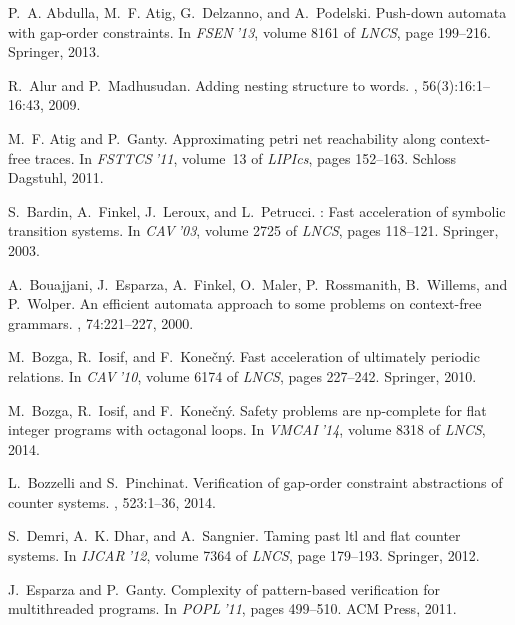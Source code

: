 \documentclass[final]{llncs}
\begin{document}

\begin{thebibliography}{10}

P.~A. Abdulla, M.~F. Atig, G.~Delzanno, and A.~Podelski.
\newblock Push-down automata with gap-order constraints.
\newblock In {\em FSEN$\:$'13}, volume 8161 of {\em LNCS}, page 199–216.
  Springer, 2013.

R.~Alur and P.~Madhusudan.
\newblock Adding nesting structure to words.
, 56(3):16:1--16:43, 2009.

M.~F. Atig and P.~Ganty.
\newblock Approximating petri net reachability along context-free traces.
\newblock In {\em FSTTCS$\:$'11}, volume~13 of {\em LIPIcs}, pages 152--163.
  Schloss Dagstuhl, 2011.

S.~Bardin, A.~Finkel, J.~Leroux, and L.~Petrucci.
: Fast acceleration of symbolic transition systems.
\newblock In {\em CAV$\:$'03}, volume 2725 of {\em LNCS}, pages 118--121.
  Springer, 2003.

A.~Bouajjani, J.~Esparza, A.~Finkel, O.~Maler, P.~Rossmanith, B.~Willems, and
  P.~Wolper.
\newblock An efficient automata approach to some problems on context-free
  grammars.
, 74:221--227, 2000.

M.~Bozga, R.~Iosif, and F.~Kone\v{c}n\'{y}.
\newblock Fast acceleration of ultimately periodic relations.
\newblock In {\em CAV$\:$'10}, volume 6174 of {\em LNCS}, pages 227--242.
  Springer, 2010.

M.~Bozga, R.~Iosif, and F.~Kone\v{c}n\'{y}.
\newblock Safety problems are np-complete for flat integer programs with
  octagonal loops.
\newblock In {\em VMCAI$\:$'14}, volume 8318 of {\em LNCS}, 2014.

L.~Bozzelli and S.~Pinchinat.
\newblock Verification of gap-order constraint abstractions of counter systems.
, 523:1–36, 2014.

S.~Demri, A.~K. Dhar, and A.~Sangnier.
\newblock Taming past ltl and flat counter systems.
\newblock In {\em IJCAR$\:$'12}, volume 7364 of {\em LNCS}, page 179–193.
  Springer, 2012.

J.~Esparza and P.~Ganty.
\newblock Complexity of pattern-based verification for multithreaded programs.
\newblock In {\em POPL$\:$'11}, pages 499--510. ACM Press, 2011.


\end{thebibliography}
\end{document}
